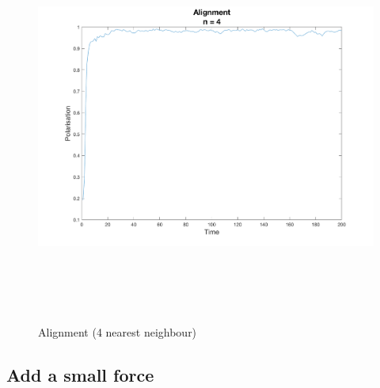 \documentclass[12pt]{article}
\begin{document}
\begin{figure}[H] %
\centering
\includegraphics[width = 16 cm, height = 13cm]{palign.png}
\caption{Alignment (4 nearest neighbour)}
\label{fig:align}
\end{figure}



\subsection{Add a small force }
\end{document}
